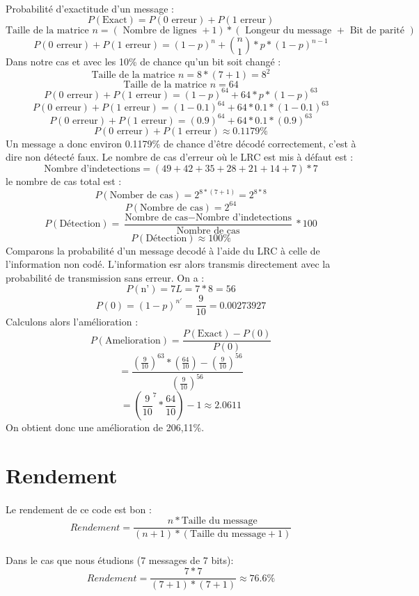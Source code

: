        \paragraph{}
Probabilité d'exactitude d'un message :
\[  P(\text{Exact}) = P(\text{0 erreur}) + P(\text{1 erreur}) \]
\[ \text{Taille de la matrice } n = ( \text{ Nombre de lignes } + 1 ) * ( \text{ Longeur du message } + \text{ Bit de parité } ) \]
\[ P(\text{0 erreur}) + P(\text{1 erreur}) = (1-p)^{n} + {n\choose 1}*p*(1-p)^{n-1} \]
Dans notre cas et avec les 10\% de chance qu'un bit soit changé :
\[ \text{Taille de la matrice } n = 8*(7+1) = 8^{2} \]
\[ \text{Taille de la matrice } n = 64 \]
\[ P(\text{0 erreur}) + P(\text{1 erreur}) = (1-p)^{64} + 64*p*(1-p)^{63} \]
\[ P(\text{0 erreur}) + P(\text{1 erreur}) = (1-0.1)^{64} + 64*0.1*(1-0.1)^{63} \]
\[ P(\text{0 erreur}) + P(\text{1 erreur}) = (0.9)^{64} + 64*0.1*(0.9)^{63} \]
\[ P(\text{0 erreur}) + P(\text{1 erreur}) \approx 0.1179\% \]
Un message a donc environ 0.1179\% de chance d'être décodé correctement, c'est à dire non détecté faux.
Le nombre de cas d'erreur où le LRC est mis à défaut est :
\[  \text{Nombre d'indetections} = (49+42+35+28+21+14+7)*7 \]
le nombre de cas total est  :
\[  P(\text{Nomber de cas}) = 2^{8*(7+1)} = 2^{8*8} \]
\[  P(\text{Nombre de cas}) = 2^{64} \]
\[  P(\text{Détection}) = \frac{\text{Nombre de cas} - \text{Nombre d'indetections}}{\text{Nombre de cas}}*100 \]
\[  P(\text{Détection}) \approx 100\% \]
Comparons la probabilité d'un message decodé à l'aide du LRC à celle de l'information non codé.
L'information esr alors transmis directement avec la probabilité de transmission sans erreur.
On a :
\[  P(\text{n'}) = 7L=7*8=56 \]
\[  P(\text{0}) = (1-p)^{n'}=\frac{9}{10} = 0.00273927\]
Calculons alors l'amélioration :
\[  P(\text{Amelioration}) = \frac{P(\text{Exact}) - P(\text{0})}{P(\text{0})} \]
\[ =\frac{(\frac{9}{10})^{63}*(\frac{64}{10})-(\frac{9}{10})^{56}}{(\frac{9}{10})^{56}} \]
\[ =(\frac{9}{10}^{7}*\frac{64}{10})-1 \approx 2.0611 \]
On obtient donc une amélioration de 206,11\%.
    \section{Rendement}

        \paragraph{}
Le rendement de ce code est bon :
\[  Rendement = \frac{n*\text{Taille du message}}{(n+1)*(\text{Taille du message}+1)} \]
        \paragraph{}
Dans le cas que nous étudions (7 messages de 7 bits):
\[  Rendement = \frac{7*7}{(7+1)*(7+1)} \approx 76.6\% \]

